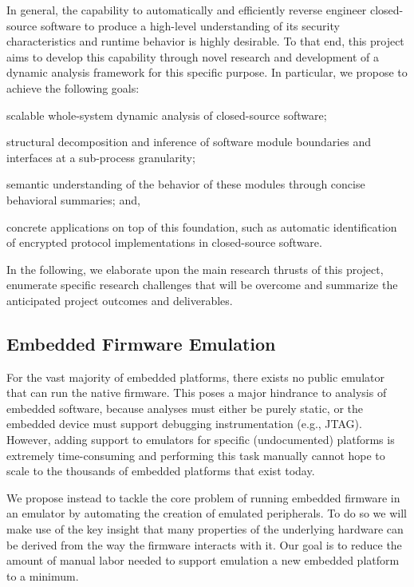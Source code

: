 \documentclass[letterpaper,twoside,11pt,headings=small]{scrartcl}
\begin{document}
In general, the capability to automatically and efficiently reverse engineer
closed-source software to produce a high-level understanding of its security
characteristics and runtime behavior is highly desirable.  To that end, this
project aims to develop this capability through novel research and development
of a dynamic analysis framework for this specific purpose.  In particular, we
propose to achieve the following goals:%
\begin{inparaenum}
    \item scalable whole-system dynamic analysis of closed-source software;
    \item structural decomposition and inference of software module boundaries and interfaces at a sub-process granularity;
    \item semantic understanding of the behavior of these modules through concise behavioral summaries; and,
    \item concrete applications on top of this foundation, such as automatic identification of encrypted protocol implementations in closed-source software.
\end{inparaenum}

In the following, we elaborate upon the main research thrusts of this project,
enumerate specific research challenges that will be overcome and summarize the
anticipated project outcomes and deliverables.


\subsection{Embedded Firmware Emulation}
\label{sec:overview:firmware}

For the vast majority of embedded platforms, there exists no public emulator
that can run the native firmware. This poses a major hindrance to analysis of
embedded software, because analyses must either be purely static, or the
embedded device must support debugging instrumentation (e.g., JTAG). However,
adding support to emulators for specific (undocumented) platforms is extremely
time-consuming and performing this task manually cannot hope to scale to the
thousands of embedded platforms that exist today.

We propose instead to tackle the core problem of running embedded firmware in
an emulator by automating the creation of emulated peripherals. To do so we
will make use of the key insight that many properties of the underlying
hardware can be derived from the way the firmware interacts with it. Our goal
is to reduce the amount of manual labor needed to support emulation a new
embedded platform to a minimum.
\end{document}
